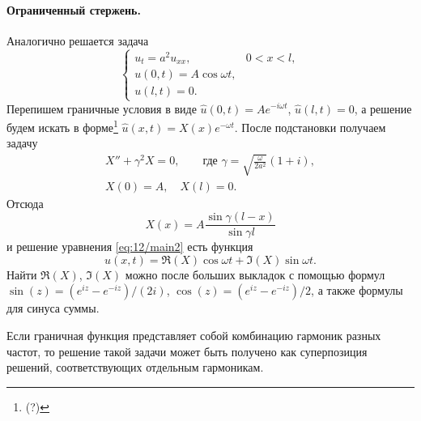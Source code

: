 \paragraph{Ограниченный стержень.}
Аналогично решается задача  
\begin{equation}
  \label{eq:12/main2}
  \begin{cases}
    u_t = a^2 u_{xx}, & 0 < x < l,\\
    u(0, t) = A\cos\omega t,\\
    u(l, t) = 0.
  \end{cases}
\end{equation}
Перепишем граничные условия в виде $ \hat u(0, t) = Ae^{-i\omega t} $, $ \hat
u(l, t) = 0 $, а решение будем искать в форме\footnote{(?)} $ \hat u(x, t) =
X(x)e^{-\omega t} $. После подстановки получаем задачу
\begin{gather*}
  X'' + \gamma^2X =0,\qquad \text{где }\gamma = \sqrt{
  \frac{\omega}{2a^2}}(1+i),\\
  X(0) = A,\quad
  X(l) = 0.
\end{gather*}
Отсюда  
\[
    X(x) = A \frac{\sin\gamma(l-x)}{\sin\gamma l}
\]
и решение уравнения \eqref{eq:12/main2} есть функция 
\[
  u(x, t) = \Re(X)\cos\omega t + \Im(X)\sin\omega t.
\]
Найти $ \Re(X) $, $ \Im(X) $ можно после больших выкладок с помощью формул $
\sin(z) = (e^{iz} - e^{-iz})/(2i) $, $ \cos(z)= (e^{iz} - e^{-iz})/2$, а также
формулы для синуса суммы.



Если граничная функция представляет собой комбинацию 
гармоник разных частот, то решение такой задачи может быть получено как
суперпозиция решений, соответствующих отдельным гармоникам.
